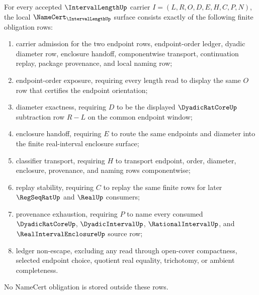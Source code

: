 \begin{theorem}
\label{thm:interval-length-namecert-obligations}
For every accepted $\IntervalLengthUp$ carrier
$I=(L,R,O,D,E,H,C,P,N)$, the local
$\NameCert_{\IntervalLengthUp}$ surface consists exactly of the following
finite obligation rows:
\begin{enumerate}
\item carrier admission for the two endpoint rows, endpoint-order ledger,
dyadic diameter row, enclosure handoff, componentwise transport,
continuation replay, package provenance, and local naming row;
\item endpoint-order exposure, requiring every length read to display the
same $O$ row that certifies the endpoint orientation;
\item diameter exactness, requiring $D$ to be the displayed
$\DyadicRatCoreUp$ subtraction row $R-L$ on the common endpoint window;
\item enclosure handoff, requiring $E$ to route the same endpoints and
diameter into the finite real-interval enclosure surface;
\item classifier transport, requiring $H$ to transport endpoint,
order, diameter, enclosure, provenance, and naming rows componentwise;
\item replay stability, requiring $C$ to replay the same finite rows for
later $\RegSeqRatUp$ and $\RealUp$ consumers;
\item provenance exhaustion, requiring $P$ to name every consumed
$\DyadicRatCoreUp$, $\DyadicIntervalUp$, $\RationalIntervalUp$, and
$\RealIntervalEnclosureUp$ source row;
\item ledger non-escape, excluding any read through open-cover compactness,
selected endpoint choice, quotient real equality, trichotomy, or ambient
completeness.
\end{enumerate}
No NameCert obligation is stored outside these rows.
\end{theorem}
